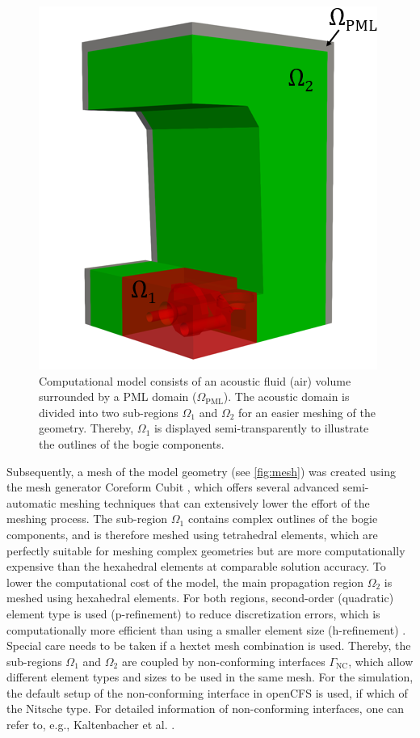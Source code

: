 \begin{figure}
	\centering
	\includegraphics{fig/chap4/mesh/region_small.png}
	\caption{Computational model consists of an acoustic fluid (air) volume surrounded by a PML domain ($\Omega_{\text{PML}}$). The acoustic domain is divided into two sub-regions $\Omega_1$ and $\Omega_2$ for an easier meshing of the geometry. Thereby, $\Omega_1$ is displayed semi-transparently to illustrate the outlines of the bogie components.}
	\label{fig:regions}
\end{figure}
Subsequently, a mesh of the model geometry (see \cref{fig:mesh}) was created using the mesh generator Coreform Cubit \cite{cubit}, which offers several advanced semi-automatic meshing techniques that can extensively lower the effort of the meshing process. The sub-region $\Omega_1$ contains complex outlines of the bogie components, and is therefore meshed using tetrahedral elements, which are perfectly suitable for meshing complex geometries but are more computationally expensive than the hexahedral elements at comparable solution accuracy. To lower the computational cost of the model, the main propagation region $\Omega_2$ is meshed using hexahedral elements. For both regions, second-order (quadratic) element type is used (p-refinement) to reduce discretization errors, which is computationally more efficient than using a smaller element size (h-refinement) \cite{Kuo_2007_prefinement}.
Special care needs to be taken if a hextet mesh combination is used. Thereby, the sub-regions $\Omega_1$ and $\Omega_2$ are coupled by non-conforming interfaces $\Gamma_\text{NC}$, which allow different element types and sizes to be used in the same mesh. For the simulation, the default setup of the non-conforming interface in openCFS is used, if which of the Nitsche type. For detailed information of non-conforming interfaces, one can refer to, e.g., Kaltenbacher et al. \cite{kaltenbacher_nonconforming_2018}.
